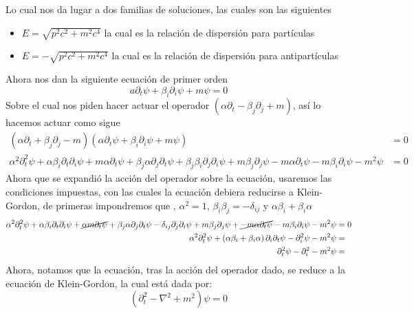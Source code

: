 \documentclass[../main_ej.tex]{subfiles}
\begin{document}
Lo cual nos da lugar a dos familias de soluciones, las cuales son las siguientes
\begin{itemize}
  \item $E=\sqrt{p^2c^2+m^2c^4}$ la cual es la relación de dispersión para partículas
  \item $E=-\sqrt{p^2c^2+m^2c^4}$ la cual es la relación de dispersión para antipartículas 
\end{itemize}
Ahora nos dan la siguiente ecuación de primer orden
\begin{equation}
  a\partial_t\psi + \beta_i\partial_i\psi + m \psi = 0
\end{equation}
Sobre el cual nos piden hacer actuar el operador $(\alpha \partial_t - \beta_j \partial_j + m)$, así lo hacemos actuar como sigue
\begin{align*}
  \left(\alpha\partial_t + \beta_j\partial_j  - m\right)\left( \alpha \partial_t\psi + \beta_i \partial_i \psi + m\psi  \right) & = 0 \\
  \alpha^2 \partial^2_t\psi + \alpha \beta_i \partial_t\partial_i \psi +m \alpha \partial_t \psi +  \beta_j\alpha \partial_j \partial_t \psi + \beta_j \beta_i \partial_j\partial_i \psi + m\beta_j\partial_j \psi - m\alpha \partial_t\psi - m\beta_i \partial_i \psi - m^2\psi & = 0 
\end{align*}
Ahora que se expandió la acción del operador sobre la ecuación, usaremos las condiciones impuestas, con las cuales la ecuación debiera reducirse a Klein-Gordon, de primeras impondremos que , $\alpha^2=1$, $\beta_i\beta_j=-\delta_{ij}$ y $\alpha \beta_i + \beta_i \alpha$ 
\begin{align*}
  \alpha^2\partial^2_t \psi +\alpha \beta_i\partial_t \partial_i \psi + \cancel{\alpha m \partial_t \psi} + \beta_j\alpha \partial_j \partial_t \psi - \delta_{ij} \partial_j \partial_i\psi + m\beta_j \partial_j \psi +\cancel{-m\alpha \partial_t \psi} - m\beta_i\partial_i \psi - m^2 \psi & = 0 \\
  \alpha^2\partial^2_t \psi + \left( \alpha \beta_i + \beta_i \alpha  \right)\partial_i \partial_t \psi - \partial^2_i\psi - m^2\psi &  =   \\
  \partial^2_t \psi - \partial^2_i - m^2\psi & = 
\end{align*}
Ahora, notamos que la ecuación, tras la acción del operador dado, se reduce a la ecuación de Klein-Gordon, la cual está dada por:
\begin{equation}
  \boxed{\left(\partial_t^2 - \nabla^2 + m^2\right)\psi = 0}
\end{equation}
\end{document}
